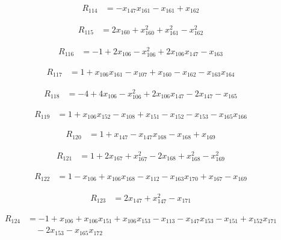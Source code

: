 \begin{align*}
R_{114} &= -x_{147} x_{161} -x_{161} +x_{162}
\end{align*}

\begin{align*}
R_{115} &= 2 x_{160} +x_{160}^{2} +x_{161}^{2} -x_{162}^{2}
\end{align*}

\begin{align*}
R_{116} &= -1 +2 x_{106} -x_{106}^{2} +2 x_{106} x_{147} -x_{163}
\end{align*}

\begin{align*}
R_{117} &= 1 +x_{106} x_{161} -x_{107} +x_{160} -x_{162} -x_{163} x_{164}
\end{align*}

\begin{align*}
R_{118} &= -4 +4 x_{106} -x_{106}^{2} +2 x_{106} x_{147} -2 x_{147} -x_{165}
\end{align*}

\begin{align*}
R_{119} &= 1 +x_{106} x_{152} -x_{108} +x_{151} -x_{152} -x_{153} -x_{165} x_{166}
\end{align*}

\begin{align*}
R_{120} &= 1 +x_{147} -x_{147} x_{168} -x_{168} +x_{169}
\end{align*}

\begin{align*}
R_{121} &= 1 +2 x_{167} +x_{167}^{2} -2 x_{168} +x_{168}^{2} -x_{169}^{2}
\end{align*}

\begin{align*}
R_{122} &= 1 -x_{106} +x_{106} x_{168} -x_{112} -x_{163} x_{170} +x_{167} -x_{169}
\end{align*}

\begin{align*}
R_{123} &= 2 x_{147} +x_{147}^{2} -x_{171}
\end{align*}

\begin{align*}
R_{124} &= -1 +x_{106} +x_{106} x_{151} +x_{106} x_{153} -x_{113} -x_{147} x_{153} -x_{151} +x_{152} x_{171} \\
&\quad -2 x_{153} -x_{165} x_{172}
\end{align*}

